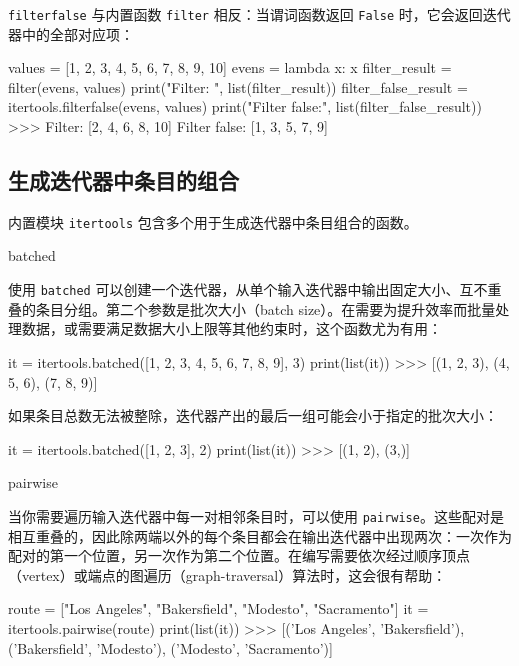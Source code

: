 \texttt{filterfalse} 与内置函数 \texttt{filter} 相反：当谓词函数返回 \texttt{False} 时，它会返回迭代器中的全部对应项：

\begin{codebox}[python]
values = [1, 2, 3, 4, 5, 6, 7, 8, 9, 10]
evens = lambda x: x %
filter_result = filter(evens, values)
print("Filter:      ", list(filter_result))
filter_false_result = itertools.filterfalse(evens, values)
print("Filter false:", list(filter_false_result))
>>>
Filter:       [2, 4, 6, 8, 10]
Filter false: [1, 3, 5, 7, 9]
\end{codebox}

\subsection{生成迭代器中条目的组合}

内置模块 \texttt{itertools} 包含多个用于生成迭代器中条目组合的函数。

\begin{codebox}[python]
batched
\end{codebox}

使用 \texttt{batched} 可以创建一个迭代器，从单个输入迭代器中输出固定大小、互不重叠的条目分组。第二个参数是批次大小（batch size）。在需要为提升效率而批量处理数据，或需要满足数据大小上限等其他约束时，这个函数尤为有用：

\begin{codebox}[python]
it = itertools.batched([1, 2, 3, 4, 5, 6, 7, 8, 9], 3)
print(list(it))
>>>
[(1, 2, 3), (4, 5, 6), (7, 8, 9)]
\end{codebox}

如果条目总数无法被整除，迭代器产出的最后一组可能会小于指定的批次大小：

\begin{codebox}[python]
it = itertools.batched([1, 2, 3], 2)
print(list(it))
>>>
[(1, 2), (3,)]
\end{codebox}

\begin{codebox}[python]
pairwise
\end{codebox}

当你需要遍历输入迭代器中每一对相邻条目时，可以使用 \texttt{pairwise}。这些配对是相互重叠的，因此除两端以外的每个条目都会在输出迭代器中出现两次：一次作为配对的第一个位置，另一次作为第二个位置。在编写需要依次经过顺序顶点（vertex）或端点的图遍历（graph-traversal）算法时，这会很有帮助：

\begin{codebox}[python]
route = ["Los Angeles", "Bakersfield", "Modesto", "Sacramento"]
it = itertools.pairwise(route)
print(list(it))
>>>
[('Los Angeles', 'Bakersfield'), ('Bakersfield', 'Modesto'),
('Modesto', 'Sacramento')]
\end{codebox}

